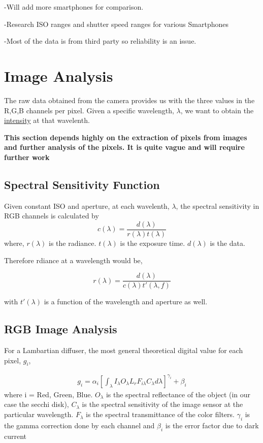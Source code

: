 \documentclass{article}
\begin{document}
-Will add more smartphones for comparison.

-Research ISO ranges and shutter speed ranges for various Smartphones

-Most of the data is from third party so reliability is an issue.

\section{Image Analysis}

The raw data obtained from the camera provides us with the three values in the
R,G,B channels per pixel. Given a specific wavelength, $ \lambda$, we want to obtain the
\underline{intensity} at that wavelenth.

\textbf{This section depends highly on the extraction of pixels from images and further analysis of the pixels. It is quite vague
and will require further work}

\subsection{Spectral Sensitivity Function}

Given constant ISO and aperture, at each wavelenth, $ \lambda$, the spectral sensitivity
in RGB channels is calculated by
$$ c(\lambda) = \frac{d(\lambda)}{r(\lambda) t(\lambda)} $$
where, $ r(\lambda)$ is the radiance. $t(\lambda) $ is the exposure time.
$d(\lambda)$ is the data.

Therefore rdiance at a wavelength would be,

$$ r(\lambda) = \frac{d(\lambda)}{c(\lambda)t'(\lambda, f)} $$

with $t'(\lambda) $ is a function of the wavelength and aperture as well.

\subsection{RGB Image Analysis}

For a Lambartian diffuser, the most general theoretical digital value for each pixel, $ g_i$,

\begin{align}
  g_i = \alpha_i
  \left[\int_{\lambda}I_{\lambda}O_{\lambda} L_{r}F_{i\lambda}C_{\lambda} d\lambda\right]^{\gamma_{i}} + \beta_{i}
\end{align}
where i = {Red, Green, Blue}. $O_{\lambda}$ is the spectral reflectance of the object (in our case the secchi disk),
$C_{\lambda}$ is the spectral sensitivity of the image sensor at the particular wavelength.
$F_{\lambda}$ is the spectral transmittance of the color filters. $ \gamma_i$ is the gamma
correction done by each channel and $ \beta_{i}$ is the error factor due to dark current
\end{document}
